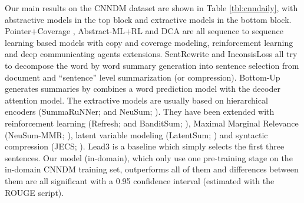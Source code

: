 \documentclass[11pt,a4paper]{article}
\begin{document}
Our main results on the CNNDM dataset are shown in Table \ref{tbl:cnndaily}, with abstractive models in the top block and extractive models in the bottom block. Pointer+Coverage \cite{see:2017:acl}, Abstract-ML+RL \cite{paulus:2017:arxiv} and DCA \cite{celikyilmaz:2016:naacl} are all sequence to sequence learning based models with copy and coverage modeling, reinforcement learning and deep communicating agents extensions. SentRewrite \cite{hsu:2018:acl} and \mbox{InconsisLoss} \cite{chen:2018:acl} all try to decompose the word by word summary generation into sentence selection from document and ``sentence'' level summarization (or compression). \mbox{Bottom-Up} \cite{gehrmann:2018:emnlp} generates summaries by combines a word prediction model with the decoder attention model. The extractive models are usually based on hierarchical encoders (SummaRuNNer; \citealt{nallapati:2017:aaai} and NeuSum; \citealt{cheng:2016:acl}). They have been extended with reinforcement learning (Refresh; \citealt{Narayan:ea:2018} and BanditSum; \citealt{dong:2018:emnlp}), Maximal Marginal Relevance (NeuSum-MMR; \citealt{zhou:2018:acl}), latent variable modeling (LatentSum; \citealt{zhang:2018:emnlp}) and syntactic compression (JECS; \citealt{xu:2019:arxiv}). Lead3 is a baseline which simply selects the first three sentences. Our model  (in-domain), which only use one pre-training stage on the in-domain CNNDM training set, outperforms all of them and differences between them are all significant with a 0.95 confidence interval (estimated with the ROUGE script).
\end{document}
